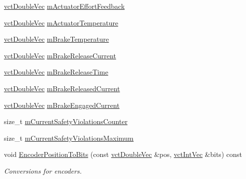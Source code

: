 \begin{DoxyCompactItemize}
\item 
\hyperlink{vct_dynamic_vector_types_8h_ade4b3068c86fb88f41af2e5187e491c2}{vct\+Double\+Vec} \hyperlink{classsaw_robot_i_o1394_1_1osa_robot1394_adf3549ef02e4240f20a349af74ae41eb}{m\+Actuator\+Effort\+Feedback}
\item 
\hyperlink{vct_dynamic_vector_types_8h_ade4b3068c86fb88f41af2e5187e491c2}{vct\+Double\+Vec} \hyperlink{classsaw_robot_i_o1394_1_1osa_robot1394_a199ba9e4231efcfb8505b92f2b51a7f2}{m\+Actuator\+Temperature}
\item 
\hyperlink{vct_dynamic_vector_types_8h_ade4b3068c86fb88f41af2e5187e491c2}{vct\+Double\+Vec} \hyperlink{classsaw_robot_i_o1394_1_1osa_robot1394_afc8bcc9aec7faac8040ade02c31be22e}{m\+Brake\+Temperature}
\item 
\hyperlink{vct_dynamic_vector_types_8h_ade4b3068c86fb88f41af2e5187e491c2}{vct\+Double\+Vec} \hyperlink{classsaw_robot_i_o1394_1_1osa_robot1394_aff3f31f6f71d5e028172058b89c6eb5a}{m\+Brake\+Release\+Current}
\item 
\hyperlink{vct_dynamic_vector_types_8h_ade4b3068c86fb88f41af2e5187e491c2}{vct\+Double\+Vec} \hyperlink{classsaw_robot_i_o1394_1_1osa_robot1394_a228ae3a31f376f2d1ece0c57b787cd0c}{m\+Brake\+Release\+Time}
\item 
\hyperlink{vct_dynamic_vector_types_8h_ade4b3068c86fb88f41af2e5187e491c2}{vct\+Double\+Vec} \hyperlink{classsaw_robot_i_o1394_1_1osa_robot1394_a28987e1bf7db987c6bfe64897b1f17af}{m\+Brake\+Released\+Current}
\item 
\hyperlink{vct_dynamic_vector_types_8h_ade4b3068c86fb88f41af2e5187e491c2}{vct\+Double\+Vec} \hyperlink{classsaw_robot_i_o1394_1_1osa_robot1394_a750756adaca4166dd9874daee0dea864}{m\+Brake\+Engaged\+Current}
\item 
size\+\_\+t \hyperlink{classsaw_robot_i_o1394_1_1osa_robot1394_a31a6983af09293393bb7b15df2c26b6f}{m\+Current\+Safety\+Violations\+Counter}
\item 
size\+\_\+t \hyperlink{classsaw_robot_i_o1394_1_1osa_robot1394_a5cbb3eae608f0e374289f215c038ae24}{m\+Current\+Safety\+Violations\+Maximum}
\item 
void \hyperlink{classsaw_robot_i_o1394_1_1osa_robot1394_aff09b06efab375206419d63342222ba6}{Encoder\+Position\+To\+Bits} (const \hyperlink{vct_dynamic_vector_types_8h_ade4b3068c86fb88f41af2e5187e491c2}{vct\+Double\+Vec} \&pos, \hyperlink{vct_dynamic_vector_types_8h_a47260df0b570a25352b3f318ed0b4c4e}{vct\+Int\+Vec} \&bits) const 
\begin{DoxyCompactList}\small\item\em Conversions for encoders. \end{DoxyCompactList}\item 

\end{DoxyCompactItemize}

